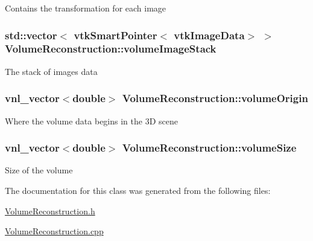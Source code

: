 Contains the transformation for each image \hypertarget{class_volume_reconstruction_a9974405ea1911b5922a28ae682087730}{
\subsubsection[{volume\-Image\-Stack}]{\setlength{\rightskip}{0pt plus 5cm}std\-::vector$<$ vtk\-Smart\-Pointer$<$ vtk\-Image\-Data$>$ $>$ {\bf Volume\-Reconstruction\-::volume\-Image\-Stack}}}\label{d0/d82/class_volume_reconstruction_a9974405ea1911b5922a28ae682087730}
The stack of images data \hypertarget{class_volume_reconstruction_ada4102ad3e89c1e3dfe2d8aa2147493a}{
\subsubsection[{volume\-Origin}]{\setlength{\rightskip}{0pt plus 5cm}vnl\-\_\-vector$<$double$>$ {\bf Volume\-Reconstruction\-::volume\-Origin}}}\label{d0/d82/class_volume_reconstruction_ada4102ad3e89c1e3dfe2d8aa2147493a}
Where the volume data begins in the 3\-D scene \hypertarget{class_volume_reconstruction_a7ad648349d7db6376ab9e2fed94cbff9}{
\subsubsection[{volume\-Size}]{\setlength{\rightskip}{0pt plus 5cm}vnl\-\_\-vector$<$double$>$ {\bf Volume\-Reconstruction\-::volume\-Size}}}\label{d0/d82/class_volume_reconstruction_a7ad648349d7db6376ab9e2fed94cbff9}
Size of the volume 

The documentation for this class was generated from the following files\-:\begin{DoxyCompactItemize}
\item 
\hyperlink{_volume_reconstruction_8h}{Volume\-Reconstruction.\-h}\item 
\hyperlink{_volume_reconstruction_8cpp}{Volume\-Reconstruction.\-cpp}\end{DoxyCompactItemize}

